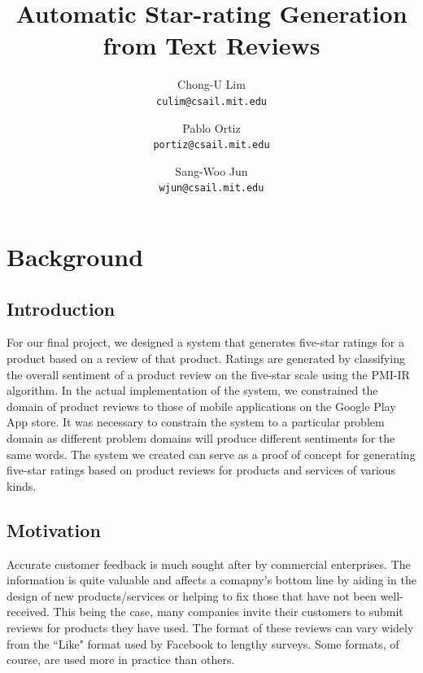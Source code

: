 \documentclass[11pt]{report} %
\title{Automatic Star-rating Generation from Text Reviews}
\author{
  Chong-U Lim\\
  \texttt{culim@csail.mit.edu}
  \and
  Pablo Ortiz\\
  \texttt{portiz@csail.mit.edu}
  \and
 Sang-Woo Jun\\
  \texttt{wjun@csail.mit.edu}
}
\begin{document}
\maketitle

\tableofcontents

\newpage
\chapter{Background}
\section{Introduction}
For our final project, we designed a system that generates five-star ratings for a product based on a review of that product. Ratings are generated by classifying the overall sentiment of a product review on the five-star scale using the PMI-IR algorithm. In the actual implementation of the system, we constrained the domain of product reviews to those of mobile applications on the Google Play App store. It was necessary to constrain the system to a particular problem domain as different problem domains will produce different sentiments for the same words. The system we created can serve as a proof of concept for generating five-star ratings based on product reviews for products and services of various kinds.

\section{Motivation}
Accurate customer feedback is much sought after by commercial enterprises. The information is quite valuable and affects a comapny's bottom line by aiding in the design of new products/services or helping to fix those that have not been well-received. This being the  case, many companies invite their customers to submit reviews for products they have used. The format of these reviews can vary widely from the ``Like" format used by Facebook to lengthy surveys. Some formats, of course, are used more in practice than others.
\end{document}

